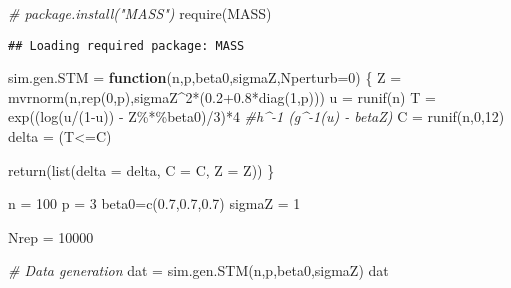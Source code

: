 \documentclass[
]{article}
\newenvironment{Shaded}{\begin{snugshade}}{\end{snugshade}}
\newcommand{\AttributeTok}[1]{\textcolor[rgb]{0.77,0.63,0.00}{#1}}
\newcommand{\CommentTok}[1]{\textcolor[rgb]{0.56,0.35,0.01}{\textit{#1}}}
\newcommand{\ControlFlowTok}[1]{\textcolor[rgb]{0.13,0.29,0.53}{\textbf{#1}}}
\newcommand{\DecValTok}[1]{\textcolor[rgb]{0.00,0.00,0.81}{#1}}
\newcommand{\FloatTok}[1]{\textcolor[rgb]{0.00,0.00,0.81}{#1}}
\newcommand{\FunctionTok}[1]{\textcolor[rgb]{0.00,0.00,0.00}{#1}}
\newcommand{\NormalTok}[1]{#1}
\newcommand{\OtherTok}[1]{\textcolor[rgb]{0.56,0.35,0.01}{#1}}
\newcommand{\SpecialCharTok}[1]{\textcolor[rgb]{0.00,0.00,0.00}{#1}}
\begin{document}
\begin{Shaded}
\begin{Highlighting}[]
\CommentTok{\# package.install("MASS")}
\FunctionTok{require}\NormalTok{(MASS)}
\end{Highlighting}
\end{Shaded}

\begin{verbatim}
## Loading required package: MASS
\end{verbatim}

\begin{Shaded}
\begin{Highlighting}[]
\NormalTok{sim.gen.STM }\OtherTok{=} \ControlFlowTok{function}\NormalTok{(n,p,beta0,sigmaZ,}\AttributeTok{Nperturb=}\DecValTok{0}\NormalTok{)}
\NormalTok{\{}
\NormalTok{  Z }\OtherTok{=} \FunctionTok{mvrnorm}\NormalTok{(n,}\FunctionTok{rep}\NormalTok{(}\DecValTok{0}\NormalTok{,p),sigmaZ}\SpecialCharTok{\^{}}\DecValTok{2}\SpecialCharTok{*}\NormalTok{(}\FloatTok{0.2+0.8}\SpecialCharTok{*}\FunctionTok{diag}\NormalTok{(}\DecValTok{1}\NormalTok{,p)))}
\NormalTok{  u }\OtherTok{=} \FunctionTok{runif}\NormalTok{(n)}
\NormalTok{  T }\OtherTok{=} \FunctionTok{exp}\NormalTok{((}\FunctionTok{log}\NormalTok{(u}\SpecialCharTok{/}\NormalTok{(}\DecValTok{1}\SpecialCharTok{{-}}\NormalTok{u)) }\SpecialCharTok{{-}}\NormalTok{ Z}\SpecialCharTok{\%*\%}\NormalTok{beta0)}\SpecialCharTok{/}\DecValTok{3}\NormalTok{)}\SpecialCharTok{*}\DecValTok{4} \CommentTok{\#h\^{}{-}1 (g\^{}{-}1(u) {-} beta\textquotesingle{}Z)}
\NormalTok{  C }\OtherTok{=} \FunctionTok{runif}\NormalTok{(n,}\DecValTok{0}\NormalTok{,}\DecValTok{12}\NormalTok{)}
\NormalTok{  delta }\OtherTok{=}\NormalTok{ (T}\SpecialCharTok{\textless{}=}\NormalTok{C)}
  
  \FunctionTok{return}\NormalTok{(}\FunctionTok{list}\NormalTok{(}\AttributeTok{delta =}\NormalTok{ delta, }\AttributeTok{C =}\NormalTok{ C, }
              \AttributeTok{Z =}\NormalTok{ Z))}
\NormalTok{\}}

\NormalTok{n }\OtherTok{=} \DecValTok{100}
\NormalTok{p }\OtherTok{=} \DecValTok{3}
\NormalTok{beta0}\OtherTok{=}\FunctionTok{c}\NormalTok{(}\FloatTok{0.7}\NormalTok{,}\FloatTok{0.7}\NormalTok{,}\FloatTok{0.7}\NormalTok{)}
\NormalTok{sigmaZ }\OtherTok{=} \DecValTok{1}

\NormalTok{Nrep }\OtherTok{=} \DecValTok{10000}

\CommentTok{\# Data generation}
\NormalTok{dat }\OtherTok{=} \FunctionTok{sim.gen.STM}\NormalTok{(n,p,beta0,sigmaZ)}
\NormalTok{dat}
\end{Highlighting}
\end{Shaded}
\end{document}
